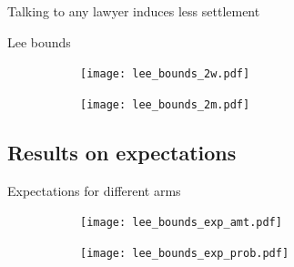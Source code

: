 \documentclass[8pt]{beamer}
\begin{document}
\begin{frame}{Talking to any lawyer induces less settlement}

 \begin{table}[H] 
 \begin{subtable}{1.\textwidth}
 \begin{center}
 \tiny{}
 \end{center}
 \end{subtable}
 \end{table}  
 
\end{frame}


\begin{frame}{Lee bounds}

\begin{figure}[H]
    \caption{Lee Bounds}
    \label{lee_bounds}
    \begin{center}
        \begin{subfigure}{0.49\textwidth}
            \centering
            \texttt{[image: lee\_bounds\_2w.pdf]}
        \end{subfigure}
        \begin{subfigure}{0.49\textwidth}
                \centering
                \texttt{[image: lee\_bounds\_2m.pdf]}
        \end{subfigure}
    \end{center} 
\end{figure} 
 
\end{frame}

\subsection{Results on expectations}
\begin{frame}{Expectations for different arms}

\begin{figure}[H]
    \begin{center}
        \begin{subfigure}{0.49\textwidth}
            \centering
            \texttt{[image: lee\_bounds\_exp\_amt.pdf]}
        \end{subfigure}
        \begin{subfigure}{0.49\textwidth}
                \centering
                \texttt{[image: lee\_bounds\_exp\_prob.pdf]}
        \end{subfigure}
    \end{center} 
\end{figure} 
\end{frame}
\end{document}
